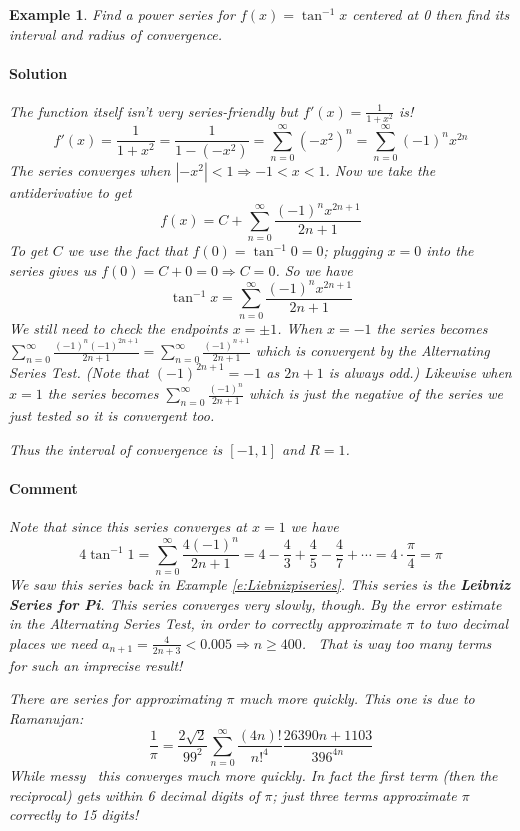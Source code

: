 \documentclass[letterpaper, 11pt, openany]{book}
\theoremstyle{mytheoremstyle}
\theoremstyle{myexamplestyle}
\newtheorem{example}{Example}[section]
\newenvironment{solution}{\paragraph{\sffamily \smaller \fontseries{b}\selectfont Solution}}{\hfill\faSquare}
\newenvironment{commentary}{\paragraph{\sffamily \smaller \fontseries{b}\selectfont Comment}}{}
\begin{document}
\begin{example}\label{e:powseriesinvtan}
    Find a power series for $f(x) = \tan^{-1} x$ centered at 0 then find its interval and radius of convergence.
    \begin{solution}
        The function itself isn't very series-friendly but $\displaystyle f'(x) = \frac{1}{1 + x^{2}}$ is! \faSmile
        \[f'(x) = \frac{1}{1 + x^{2}} = \frac{1}{1 - (-x^{2})} = \sum_{n = 0}^{\infty} (-x^{2})^{n} = \sum_{n = 0}^{\infty} (-1)^{n}x^{2n}\]
        The series converges when $|-x^{2}| < 1 \Rightarrow -1 < x < 1$. Now we take the antiderivative to get
        \[f(x) = C + \sum_{n = 0}^{\infty} \frac{(-1)^{n} x^{2n+1}}{2n+1}\]
        To get $C$ we use the fact that $f(0) = \tan^{-1} 0 = 0$; plugging $x=0$ into the series gives us $f(0) = C + 0 = 0 \Rightarrow C = 0$. So we have
        \[\tan^{-1} x = \sum_{n = 0}^{\infty} \frac{(-1)^{n} x^{2n+1}}{2n+1}\]
        We still need to check the endpoints $x = \pm 1$. When $x=-1$ the series becomes $\displaystyle \sum_{n = 0}^{\infty} \frac{(-1)^{n} (-1)^{2n+1}}{2n+1} = \sum_{n = 0}^{\infty} \frac{(-1)^{n+1}}{2n+1}$ which is convergent by the Alternating Series Test. (Note that $(-1)^{2n+1} = -1$ as $2n+1$ is always odd.) Likewise when $x=1$ the series becomes $\displaystyle \sum_{n = 0}^{\infty} \frac{(-1)^{n}}{2n+1}$ which is just the negative of the series we just tested so it is convergent too.

        Thus the interval of convergence is $[-1, 1]$ and $R=1$.
    \end{solution}
    \begin{commentary}
        Note that since this series converges at $x=1$ we have
        \[4\tan^{-1} 1 = \sum_{n = 0}^{\infty} \frac{4(-1)^{n}}{2n+1} = 4 - \frac{4}{3} + \frac{4}{5} - \frac{4}{7} + \cdots = 4\cdot \frac{\pi}{4} = \pi\]
        We saw this series back in Example \ref{e:Liebnizpiseries}. This series is the \textbf{Leibniz Series for Pi}. This series converges very slowly, though. By the error estimate in the Alternating Series Test, in order to correctly approximate $\pi$ to two decimal places we need $\displaystyle a_{n+1} = \frac{4}{2n+3} < 0.005 \Rightarrow n \geq 400$. \faFrown \ That is way too many terms for such an imprecise result!

        There are series for approximating $\pi$ much more quickly. This one is due to Ramanujan:
        \[\frac{1}{\pi} = \frac{2\sqrt{2}}{99^{2}}\sum_{n=0}^{\infty} \frac{(4n)!}{n!^{4}}\frac{26390n+1103}{396^{4n}}\]
        While messy \faMeh \ this converges much more quickly. In fact the first term (then the reciprocal) gets within 6 decimal digits of $\pi$; just three terms approximate $\pi$ correctly to 15 digits!
    \end{commentary}
\end{example}
\end{document}
